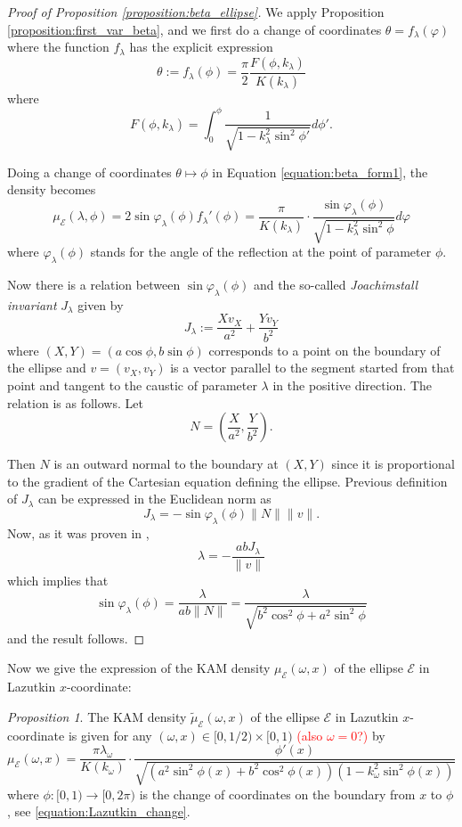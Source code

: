 \documentclass[12pt, openany]{amsart}
\theoremstyle{definition}
\theoremstyle{remark}
\theoremstyle{remark}
\theoremstyle{theorem}
\theoremstyle{theorem}
\theoremstyle{theorem}
\newtheorem{proposition}[theorem]{Proposition}
\theoremstyle{theorem}
\begin{document}
\begin{proof}[Proof of Proposition \ref{proposition:beta_ellipse}]
We apply Proposition \ref{proposition:first_var_beta}, and we first do a change of coordinates 
$\theta = f_{\lambda}(\varphi)$ where the function $f_{\lambda}$ has the explicit expression 
\[
\theta := f_{\lambda}(\phi) = \frac{\pi}{2}\frac{F(\phi,k_{\lambda})}{K(k_{\lambda})}
\]
where
\[
F(\phi,k_{\lambda}) = \int_{0}^{\phi}\frac{1}{\sqrt{1-k_{\lambda}^2\sin^2\phi'}}d\phi'.
\]

Doing a change of coordinates $\theta\mapsto\phi$ in Equation \eqref{equation:beta_form1}, the density becomes
\begin{equation}
\mu_{\mathscr E}(\lambda,\phi) = 2\sin\varphi_{\lambda}(\phi)f_{\lambda}'(\phi)
=\frac{\pi}{K(k_{\lambda})}\cdot \frac{\sin\varphi_{\lambda}(\phi)}{\sqrt{1-k_{\lambda}^2\sin^2\phi}}d\varphi
\end{equation}
where $\varphi_{\lambda}(\phi)$ stands for the angle of the reflection at the point of parameter $\phi$. 


Now there is a relation between $\sin\varphi_{\lambda}(\phi)$ and the so-called {\it Joachimstall invariant} \cite{FierobeCMPLX, Tabach} $J_{\lambda}$ given by
\[
J_{\lambda} := \frac{Xv_X}{a^2}+\frac{Yv_Y}{b^2}
\]
where $(X,Y)=(a\cos\phi,b\sin\phi)$ corresponds to a point  on the boundary of the ellipse and $v=(v_X,v_Y)$ is a vector 
parallel to the segment started from that point and tangent to the caustic of parameter $\lambda$ in the positive direction. The relation is as follows. Let 
\[
N = \left(\frac{X}{a^2},\frac{Y}{b^2}\right).
\]

Then $N$ is an outward normal to the boundary at $(X,Y)$ since it is proportional to the gradient of the Cartesian equation defining the ellipse. Previous definition of $J_{\lambda}$ can be expressed in the Euclidean norm as
\[
J_{\lambda} = -\sin\varphi_{\lambda}(\phi)\|N\|\|v\|.
\]
Now, as it was proven in \cite{FierobeCMPLX},
\[
\lambda = -\frac{abJ_{\lambda}}{\|v\|}
\]
which implies that
\[
\sin\varphi_{\lambda}(\phi) = \frac{\lambda}{ab\|N\|} = \frac{\lambda}{\sqrt{b^2\cos^2\phi+a^2\sin^2\phi}}
\]
and the result follows.
\end{proof}

Now we give the expression of the KAM density $\mu_{\mathscr E}(\omega,x)$ of the ellipse $\mathscr E$ in Lazutkin $x$-coordinate:

\begin{proposition}
\label{proposition:beta_ellipse_x}
The KAM density $\tilde\mu_{\mathscr E}(\omega,x)$ of the ellipse $\mathscr E$ in Lazutkin $x$-coordinate is given for any $(\omega,x)\in[0,1/2)\times[0,1)$ \textcolor{red}{(also $\omega =0$?) }by
\begin{equation}
\label{equation:beta_ellipse_x}
\mu_{\mathscr E}(\omega,x) = 
\frac{\pi\lambda_{\omega}}{K(k_{\omega})}\cdot
\frac{\phi'(x)}
{\sqrt{(a^2\sin^2\phi(x)+b^2\cos^2\phi(x))(1-k_{\omega}^2\sin^2\phi(x))}}
\end{equation}
where $\phi:[0,1)\to[0,2\pi)$ is the change of coordinates on the boundary from $x$ to $\phi$, see \eqref{equation:Lazutkin_change}.
\end{proposition}
\end{document}
